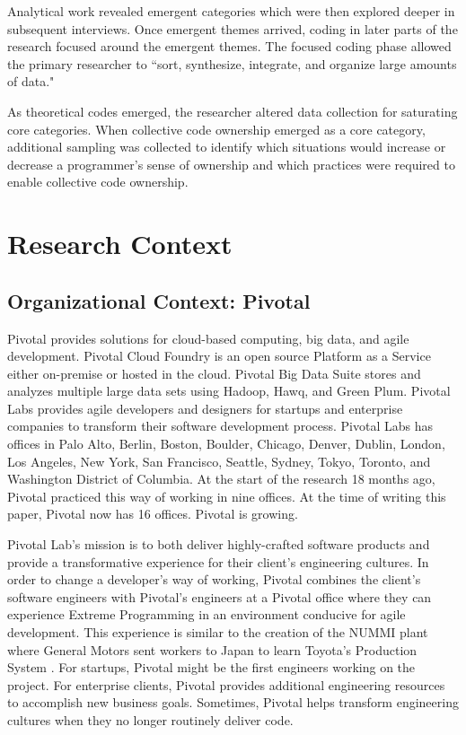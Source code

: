 Analytical work revealed emergent categories which were then explored deeper in subsequent interviews.  Once emergent themes arrived, coding in later parts of the research focused around the emergent themes. The focused coding phase allowed the primary researcher to ``sort, synthesize, integrate, and organize large amounts of data."

As theoretical codes emerged, the researcher altered data collection for saturating core categories. When collective code ownership emerged as a core category, additional sampling was collected to identify which situations would increase or decrease a programmer's sense of ownership and which practices were required to enable collective code ownership.

\section{Research Context}
\label{ResearchContext}
\subsection{Organizational Context: Pivotal}
Pivotal provides solutions for cloud-based computing, big data, and agile development. Pivotal Cloud Foundry is an open source Platform as a Service either on-premise or hosted in the cloud. Pivotal Big Data Suite stores and analyzes multiple large data sets using Hadoop, Hawq, and Green Plum. Pivotal Labs provides agile developers and designers for startups and enterprise companies to transform their software development process. Pivotal Labs has offices in Palo Alto, Berlin, Boston, Boulder, Chicago, Denver, Dublin, London, Los Angeles, New York, San Francisco, Seattle, Sydney, Tokyo, Toronto, and Washington District of Columbia. At the start of the research 18 months ago, Pivotal practiced this way of working in nine offices. At the time of writing this paper, Pivotal now has 16 offices. Pivotal is growing.

Pivotal Lab's mission is to both deliver highly-crafted software products and provide a transformative experience for their client's engineering cultures. In order to change a developer's way of working, Pivotal combines the client's software engineers with Pivotal's engineers at a Pivotal office where they can experience Extreme Programming in an environment conducive for agile development. This experience is similar to the creation of the NUMMI plant where General Motors sent workers to Japan to learn Toyota's Production System \cite{Nummi}. For startups, Pivotal might be the first engineers working on the project. For enterprise clients, Pivotal provides additional engineering resources to accomplish new business goals. Sometimes, Pivotal helps transform engineering cultures when they no longer routinely deliver code.  

